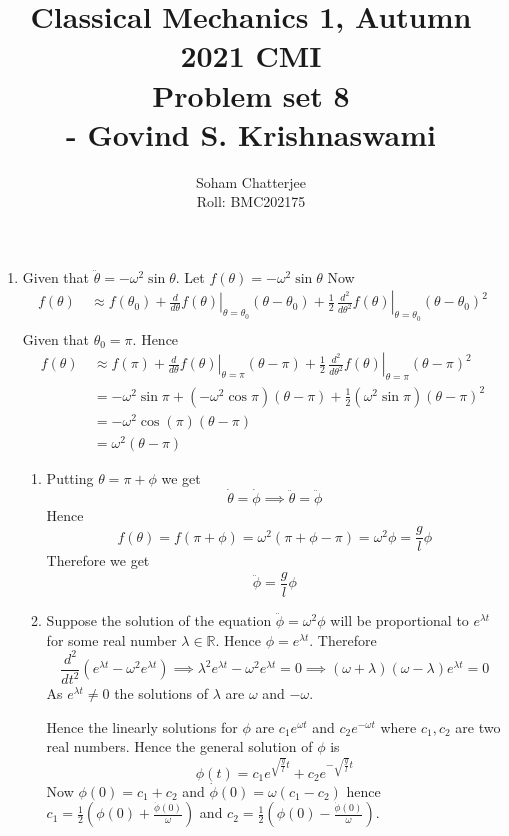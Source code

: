 \documentclass{article}
\title{\huge{Classical Mechanics 1, Autumn 2021 CMI \\ Problem set 8\\\hspace{7cm}- Govind S. Krishnaswami}
}
\author{Soham Chatterjee\\Roll: BMC202175}
\date{}
\begin{document}


	\maketitle\pagebreak
	\begin{enumerate}
		\item 
			Given that $\ddot{\theta}=-\omega^2 \sin\theta$. Let $f(\theta)=-\omega^2\sin\theta$ Now \begin{align*}
				f(\theta)\ &\approx f(\theta_0)+\left.\frac{d}{d\theta}f(\theta)\right|_{\theta=\theta_0}(\theta-\theta_0)+\frac12\, \left.\frac{d^2}{d\theta^2}f(\theta)\right|_{\theta=\theta_0}(\theta-\theta_0)^2\\
			\end{align*}Given that $\theta_0=\pi$. Hence \begin{align*}
			f(\theta)\ &\approx f(\pi)+\left.\frac{d}{d\theta}f(\theta)\right|_{\theta=\pi}(\theta-\pi)+\frac12\, \left.\frac{d^2}{d\theta^2}f(\theta)\right|_{\theta=\pi}(\theta-\pi)^2\\
			& = -\omega^2\sin\pi+(-\omega^2\cos\pi)(\theta-\pi)+\frac12 (\omega^2\sin\pi)(\theta-\pi)^2\\
			&=-\omega^2\cos(\pi)(\theta-\pi)\\
			&=\omega^2(\theta-\pi)
		\end{align*}\begin{enumerate}\item Putting $\theta=\pi+\phi$ we get $$\dot{\theta}=\dot{\phi}\implies  \ddot{\theta}=\ddot{\phi}$$Hence $$f(\theta)=f(\pi+\phi)=\omega^2(\pi+\phi-\pi)=\omega^2\phi=\frac{g}{l}\phi$$Therefore we get $$\ddot{\phi}=\frac{g}{l}\phi$$
		\item Suppose the solution of the equation $\ddot{\phi}=\omega^2\phi $ will be proportional to $e^{\lambda t}$ for some real number $\lambda\in\mathbb{R}$. Hence $\phi=e^{\lambda t}$. Therefore$$\frac{d^2}{dt^2}(e^{\lambda t}-\omega^2e^{\lambda t})\implies \lambda^2e^{\lambda t}-\omega^2e^{\lambda t}=0\implies (\omega+\lambda)(\omega-\lambda)e^{\lambda t}=0$$As $e^{\lambda t}\neq 0$ the solutions of $\lambda $ are $\omega $ and $-\omega$.
		\setlength{\parindent}{1cm}
		
		Hence the linearly solutions for $\phi$ are $c_1e^{\omega t}$ and $c_2e^{-\omega t}$  where $c_1,c_2$ are two real numbers. Hence the general solution of $\phi$ is $$\phi(t)=c_1e^{\sqrt{\frac{g}{l}} t}+c_2e^{-\sqrt{\frac{g}{l}} t}$$Now $\phi(0)=c_1+c_2$ and $\dot{\phi}(0)=\omega(c_1-c_2)$ hence $c_1=\frac12(\phi(0)+\frac{\dot{\phi}(0)}{\omega})$ and $c_2=\frac12(\phi(0)-\frac{\dot{\phi}(0)}{\omega})$.
		

\end{enumerate}
\end{enumerate}
\end{document}
